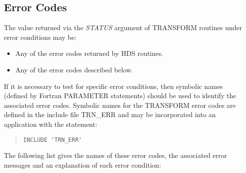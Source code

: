 \documentclass[twoside,11pt]{article}
\newcommand{\xlabel}[1]{}
\newcommand{\name}[1]{\mbox{\small{#1}}}
\newcommand{\fortvar}[1]{\mbox{\emph{#1}}}
\begin{document}
\subsection{\xlabel{error_codes}Error Codes}

The value returned via the \fortvar{STATUS} argument of \name{TRANSFORM}
routines under error conditions may be: 

\begin{itemize}

\item Any of the error codes returned by \name{HDS} routines.

\item Any of the error codes described below.

\end{itemize}

If it is necessary to test for specific error conditions, then symbolic
names (defined by Fortran \name{PARAMETER} statements) should be used to
identify the associated error codes. 
Symbolic names for the \name{TRANSFORM} error codes are defined in the
include file \name{TRN\_ERR} and may be incorporated into an application
with the statement: 

\begin{quote}
\begin{verbatim}
INCLUDE 'TRN_ERR'
\end{verbatim}
\end{quote}

The following list gives the names of these error codes, the associated
error messages and an explanation of each error condition: 
\end{document}
